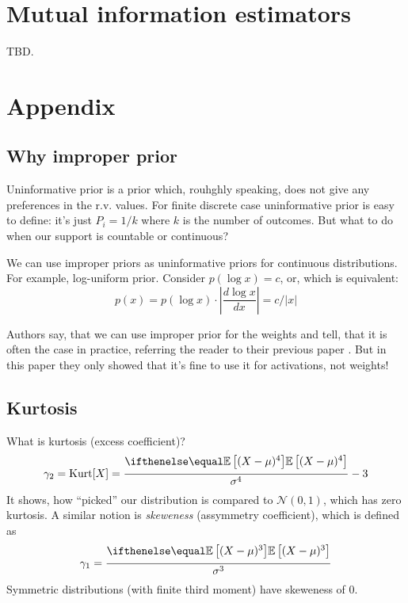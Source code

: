 \documentclass{article}
\begin{document}
\section{Mutual information estimators}
TBD.
%
%
%

\section{Appendix}
\subsection*{Why improper prior}
Uninformative prior is a prior which, rouhghly speaking, does not give any preferences in the r.v. values.
For finite discrete case uninformative prior is easy to define: it's just $P_i = 1/k$ where $k$ is the number of outcomes.
But what to do when our support is countable or continuous?

We can use improper priors as uninformative priors for continuous distributions.
For example, log-uniform prior.
Consider $p(\log x) = c$, or, which is equivalent:
\[
p(x) = p(\log x) \cdot \left|\frac{d\log x}{dx}\right| = c / |x|
\]

Authors say, that we can use improper prior for the weights and tell, that it is often the case in practice, referring the reader to their previous paper \cite{Information_Dropout}.
But in this paper they only showed that it's fine to use it for activations, not weights!

\subsection*{Kurtosis}
What is kurtosis (excess coefficient)?
\[
\gamma_2 = \text{Kurt}[X] = \frac{\expect{(X - \mu)^4}}{\sigma^4} - 3
\]
It shows, how ``picked'' our distribution is compared to $\mathcal{N}(0,1)$, which has zero kurtosis.
A similar notion is \textit{skeweness} (assymmetry coefficient), which is defined as
\[
\gamma_1 = \frac{\expect{(X - \mu)^3}}{\sigma^3}
\]
Symmetric distributions (with finite third moment) have skeweness of 0.
\end{document}
